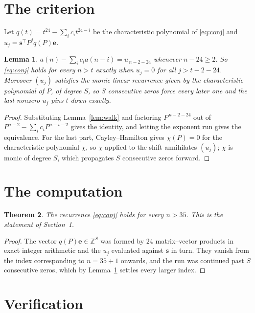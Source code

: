\documentclass[11pt,a4paper]{article}
\theoremstyle{plain}
\newtheorem{theorem}{Theorem}
\newtheorem{lemma}[theorem]{Lemma}
\theoremstyle{definition}
\begin{document}
\section{The criterion}

Let $q(t)=t^{24}-\sum_i c_i t^{24-i}$ be the characteristic polynomial of
\eqref{eq:conj} and $u_j=\mathbf{s}^{\!\top}P^{j}q(P)\mathbf{e}$.

\begin{lemma}\label{lem:crit}
$a(n)-\sum_i c_i a(n-i)=u_{\,n-2-24}$ whenever $n-24\ge2$. So \eqref{eq:conj}
holds for every $n>t$ exactly when $u_j=0$ for all $j>t-2-24$. Moreover $(u_j)$
satisfies the monic linear recurrence given by the characteristic polynomial of $P$, of
degree $S$, so $S$ consecutive zeros force every later one and the last nonzero $u_j$ pins
$t$ down exactly.
\end{lemma}

\begin{proof}
Substituting Lemma~\ref{lem:walk} and factoring $P^{\,n-2-24}$ out of
$P^{n-2}-\sum_i c_i P^{n-i-2}$ gives the identity, and letting the exponent run gives the
equivalence. For the last part, Cayley--Hamilton gives $\chi(P)=0$ for the characteristic
polynomial $\chi$, so $\chi$ applied to the shift annihilates $(u_j)$; $\chi$ is monic of
degree $S$, which propagates $S$ consecutive zeros forward.
\end{proof}

\section{The computation}

\begin{theorem}
The recurrence \eqref{eq:conj} holds for every $n>35$. This is the statement of
Section~1.
\end{theorem}

\begin{proof}
The vector $q(P)\mathbf{e}\in\mathbb{Z}^{S}$ was formed by $24$ matrix--vector
products in exact integer arithmetic and the $u_j$ evaluated against $\mathbf{s}$ in turn.
They vanish from the index corresponding to $n=35+1$ onwards, and the run was continued
past $S$ consecutive zeros, which by Lemma~\ref{lem:crit} settles every larger index.
\end{proof}

\section{Verification}
\end{document}

